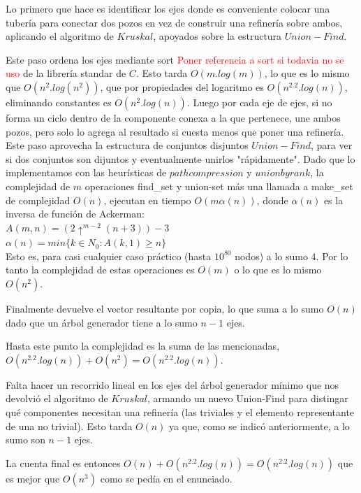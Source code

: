 	Lo primero que hace es identificar los ejes donde es conveniente colocar una tuber\'ia para conectar dos pozos en vez de construir una refiner\'ia sobre ambos, aplicando el algoritmo de $Kruskal$, apoyados sobre la estructura $Union-Find$.
	
	Este paso ordena los ejes mediante sort \textcolor{red}{Poner referencia a sort si todavia no se uso} de la librer\'ia standar de $C$. Esto tarda $O(m.log(m))$, lo que es lo mismo que $O(n^2.log(n^2))$, que por propiedades del logaritmo es $O(n^2.2.log(n))$, eliminando constantes es $O(n^2.log(n))$. Luego por cada eje de ejes, si no forma un ciclo dentro de la componente conexa a la que pertenece, une ambos pozos, pero solo lo agrega al resultado si cuesta menos que poner una refiner\'ia. Este paso aprovecha la estructura de conjuntos disjuntos $Union-Find$, para ver si dos conjuntos son dijuntos y eventualmente unirlos "r\'apidamente". Dado que lo implementamos con las heur\'isticas de $path compression$ y $union by rank$, la complejidad de $m$ operaciones find_set y union-set m\'as una llamada a make_set de complejidad $O(n)$, ejecutan en tiempo $O(m\alpha(n))$, donde $\alpha(n)$ es la inversa de funci\'on de Ackerman:\\
	
	$A(m,n) = (2\uparrow^{m-2}(n+3))-3$\\
	
	$\alpha(n) = min\{k \in N_0 : A(k,1) \geq n\}$\\
	
	Esto es, para casi cualquier caso pr\'actico (hasta $10^{80}$ nodos) a lo sumo 4. Por lo tanto la complejidad de estas operaciones es $O(m)$ o lo que es lo mismo $O(n^2)$.
	
	Finalmente devuelve el vector resultante por copia, lo que suma a lo sumo $O(n)$ dado que un \'arbol generador tiene a lo sumo $n-1$ ejes.
	
	Hasta este punto la complejidad es la suma de las mencionadas, $O(n^2.2.log(n)) + O(n^2) = O(n^2.2.log(n))$.
	
	Falta hacer un recorrido lineal en los ejes del \'arbol generador m\'inimo que nos devolvi\'o el algoritmo de $Kruskal$, armando un nuevo Union-Find para distingar qu\'e componentes necesitan una refiner\'ia (las triviales y el elemento representante de una no trivial). Esto tarda $O(n)$ ya que, como se indic\'o anteriormente, a lo sumo son $n-1$ ejes.
	
	La cuenta final es entonces $O(n) + O(n^2.2.log(n)) = O(n^2.2.log(n))$ que es mejor que $O(n^3)$ como se ped\'ia en el enunciado.

